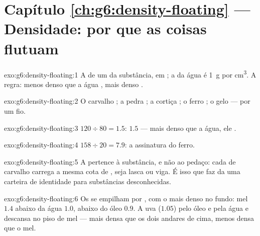 \section*{Capítulo \ref{ch:g6:density-floating} --- Densidade: por que as coisas flutuam}

\begin{solution}{exo:g6:density-floating:1}
A  de um  da substância, em ; a da água é
\qty{1}{g} por \unit{cm^3}. A regra: menos denso que a água ,
mais denso .
\end{solution}

\begin{solution}{exo:g6:density-floating:2}
O carvalho ; a pedra ; a cortiça ; o ferro ;
o gelo  --- por um fio.
\end{solution}

\begin{solution}{exo:g6:density-floating:3}
$120 \div 80 = 1.5$:  $1.5$ --- mais denso que a água, ele
.
\end{solution}

\begin{solution}{exo:g6:density-floating:4}
$158 \div 20 = 7.9$: a assinatura do ferro.
\end{solution}

\begin{solution}{exo:g6:density-floating:5}
A  pertence à substância, e não ao pedaço: cada  de carvalho carrega a mesma cota de , seja lasca ou
viga. É isso que faz da  uma carteira de identidade para
substâncias desconhecidas.
\end{solution}

\begin{solution}{exo:g6:density-floating:6}
Os  se empilham por , com o mais denso no fundo: mel
$1.4$ abaixo da água $1.0$, abaixo do óleo $0.9$. A uva ($1.05$)
 pelo óleo e pela água e descansa no piso de mel --- mais densa
que os dois andares de cima, menos densa que o mel.
\end{solution}

